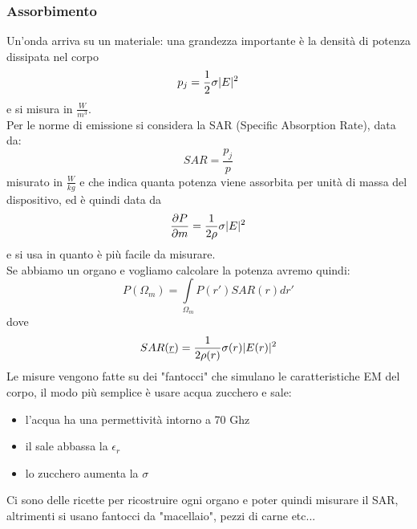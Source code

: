 \documentclass[oneside, 12pt]{extbook}
\DeclarePairedDelimiter{\abs}{\lvert}{\rvert}
\begin{document}
\subsubsection{Assorbimento}
Un'onda arriva su un materiale: una grandezza importante è la densità di potenza dissipata nel corpo
\begin{equation}
	p_j = \frac{1}{2} \sigma \abs{E}^2
\end{equation}
e si misura in $\frac{W}{m^3}$.\\Per le norme di emissione si considera la SAR (Specific Absorption Rate), data da:
\begin{equation}
	SAR = \frac{p_j}{p}
\end{equation}
misurato in $\frac{W}{kg}$ e che indica quanta potenza viene assorbita per unità di massa del dispositivo, ed è quindi data da 
\begin{equation}
	\frac{\partial P}{\partial m} = \frac{1}{2\rho} \sigma \abs{E}^2
\end{equation}
e si usa in quanto è più facile da misurare.\\Se abbiamo un organo e vogliamo calcolare la potenza avremo quindi:
\begin{equation}
	P(\Omega_m) = \int\limits_{\Omega_m} P(r')SAR(r) dr'
\end{equation}
dove 
\begin{equation}
	SAR(\underline{r}) = \frac{1}{2 \rho(r)} \sigma(r) \abs{E(r)}^2 
\end{equation}
Le misure vengono fatte su dei "fantocci" che simulano le caratteristiche EM del corpo, il modo più semplice è usare acqua zucchero e sale:
\begin{itemize}
	\item l'acqua ha una permettività intorno a 70 Ghz
	\item il sale abbassa la $\epsilon_r$
	\item lo zucchero aumenta la $\sigma$
\end{itemize}
Ci sono delle ricette per ricostruire ogni organo e poter quindi misurare il SAR, altrimenti si usano fantocci da "macellaio", pezzi di carne etc...
\end{document}
